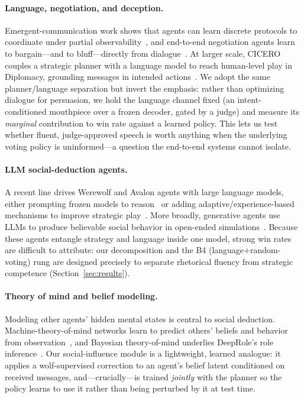 \documentclass[11pt]{article}
\begin{document}
\paragraph{Language, negotiation, and deception.} Emergent-communication work shows
that agents can learn discrete protocols to coordinate under partial
observability~\citep{foerster2016learning}, and end-to-end negotiation agents learn
to bargain---and to bluff---directly from dialogue~\citep{lewis2017deal}. At larger
scale, CICERO couples a strategic planner with a language model to reach
human-level play in Diplomacy, grounding messages in intended
actions~\citep{fair2022diplomacy}. We adopt the same planner/language separation
but invert the emphasis: rather than optimizing dialogue for persuasion, we hold
the language channel fixed (an intent-conditioned mouthpiece over a frozen decoder,
gated by a judge) and measure its \emph{marginal} contribution to win rate against
a learned policy. This lets us test whether fluent, judge-approved speech is worth
anything when the underlying voting policy is uninformed---a question the
end-to-end systems cannot isolate.

\paragraph{LLM social-deduction agents.} A recent line drives Werewolf and Avalon
agents with large language models, either prompting frozen models to
reason~\citep{xu2023werewolf} or adding adaptive/experience-based mechanisms to
improve strategic play~\citep{lan2024werewolf}. More broadly, generative agents use
LLMs to produce believable social behavior in open-ended
simulations~\citep{park2023generative}. Because these agents entangle strategy and
language inside one model, strong win rates are difficult to attribute: our
decomposition and the B4 (language$+$random-voting) rung are designed precisely to
separate rhetorical fluency from strategic competence
(Section~\ref{sec:results}).

\paragraph{Theory of mind and belief modeling.} Modeling other agents' hidden
mental states is central to social deduction. Machine-theory-of-mind networks learn
to predict others' beliefs and behavior from observation~\citep{rabinowitz2018machine},
and Bayesian theory-of-mind underlies DeepRole's role
inference~\citep{serrino2019finding}. Our social-influence module is a lightweight,
learned analogue: it applies a wolf-supervised correction to an agent's belief
latent conditioned on received messages, and---crucially---is trained
\emph{jointly} with the planner so the policy learns to use it rather than being
perturbed by it at test time.
\end{document}
